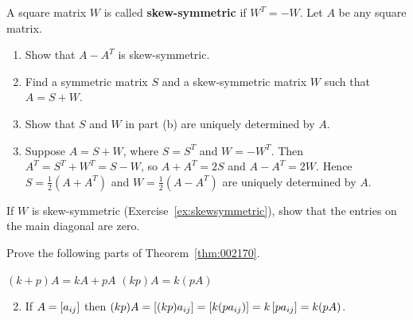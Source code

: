 \begin{multicols}{2}
\columnbreak
\begin{ex}\label{ex:skewsymmetric}
A square matrix $W$ is called \textbf{skew-symmetric} if $W^{T} = -W$. Let $A$ be any square matrix.


\begin{enumerate}[label={\alph*.}]
\item Show that $A - A^{T}$ is skew-symmetric.

\item Find a symmetric matrix $S$ and a skew-symmetric matrix $W$ such that $A = S + W$.

\item Show that $S$ and $W$ in part (b) are uniquely determined by $A$.

\end{enumerate}
\begin{sol}
\begin{enumerate}[label={\alph*.}]
\setcounter{enumi}{2}
\item  Suppose $A = S + W$, where $S = S^{T}$ and $W = -W^{T}$. Then $A^{T} = S^{T} + W^{T} = S - W$, so $A + A^{T} = 2S$ and $A - A^{T} = 2W$. Hence $S = \frac{1}{2}(A + A^{T})$ and $W = \frac{1}{2}(A - A^{T})$ are uniquely determined by $A$.

\end{enumerate}
\end{sol}
\end{ex}

\begin{ex}
If $W$ is skew-symmetric (Exercise~\ref{ex:skewsymmetric}), show that the entries on the main diagonal are zero. 
\end{ex}

\begin{ex}
Prove the following parts of Theorem~\ref{thm:002170}.
\begin{exenumerate}
\exitem $(k + p)A = kA + pA$
\exitem $(kp)A = k(pA)$
\end{exenumerate}
\begin{sol}
\begin{enumerate}[label={\alph*.}]
\setcounter{enumi}{1}
\item  If $A = \left[ a_{ij} \right]$ then $(kp)A = \left[ (kp)a_{ij} \right] = \left[ k(pa_{ij}) \right] = k \left[ pa_{ij} \right] = k(pA)$.

\end{enumerate}
\end{sol}
\end{ex}


\end{multicols}
